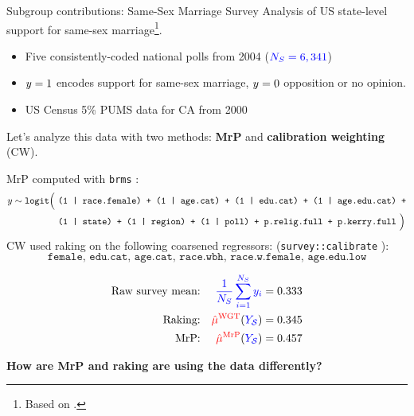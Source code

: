 








\begin{frame}{Subgroup contributions: Same-Sex Marriage Survey}
Analysis of US state-level support for same-sex marriage\footnote{
    Based on \textcite{lax:2009:gay,kastellec:2010:laxmrp}.}.

\begin{itemize}
    \item {} Five consistently-coded national polls from 2004 
        ($\textcolor{blue}{{\textcolor{blue}{N_S}} ={}6,341}$)
    \item {}  $y = 1$ encodes support for same-sex marriage, $y = 0$ opposition
       or no opinion.
    \item {} US Census 5\% PUMS data for CA from 2000
\end{itemize}

\pause
Let's analyze this data with two methods: \textbf{MrP} and \textbf{calibration weighting} (CW).

\pause
MrP computed with \texttt{brms} \parencite{brms}:\\
{
\tiny
$$
\begin{aligned}
y \sim{}& \texttt{logit}\Big(~\texttt{(1 | race.female) + (1 | age.cat) + 
  (1 | edu.cat) + (1 | age.edu.cat) +}
  \\{}&\qquad\quad\;\; \texttt{(1 | state) + (1 | region) + (1 | poll) +
  p.relig.full + p.kerry.full}~\Big)
\end{aligned}
$$
}
%
CW used raking on the following coarsened regressors:
({\tiny{\texttt{survey::calibrate}}} \textcite{lumley:2025:survey}):
{
\tiny
$$
\texttt{female, edu.cat, age.cat, race.wbh, race.w.female, age.edu.low}
$$
}
%
\pause
%
\begin{minipage}{0.5\textwidth}
\vspace{-1.5em}
$$
\begin{aligned}
    \textrm{Raw survey mean:} && \textcolor{blue}{\frac{1}{{\textcolor{blue}{N_S}}} \sum_{i=1}^{\textcolor{blue}{N_S}} y_i} ={}& 0.333 \\
    \textrm{Raking:} && \textcolor{red}{\hat{\mu}^{\mathrm{WGT}}}(\textcolor{blue}{\textcolor{blue}{Y_{\mathcal{S}}}}) ={}& 0.345 \\
    \textrm{MrP:} && \textcolor{red}{\hat{\mu}^{\mathrm{MrP}}}(\textcolor{blue}{\textcolor{blue}{Y_{\mathcal{S}}}}) ={}& 0.457\\
\end{aligned}
$$
\end{minipage}
\hfill
\begin{minipage}{0.4\textwidth}
\vspace{-1.5em}
    \pause
    \textbf{How are MrP and raking are using the data differently?}
\end{minipage}
%
%
\end{frame}





